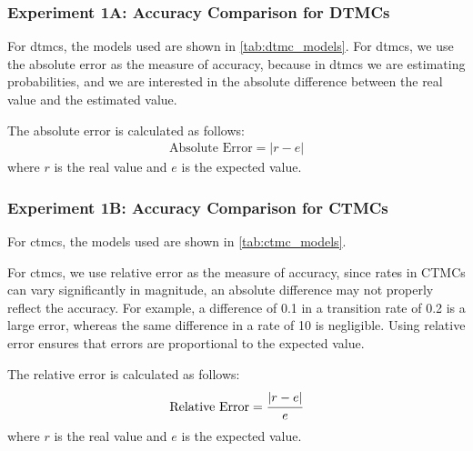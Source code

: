 
\subsubsection{Experiment 1A: Accuracy Comparison for DTMCs}
For \glspl{dtmc}, the models used are shown in \autoref{tab:dtmc_models}.
For \glspl{dtmc}, we use the absolute error as the measure of accuracy, because in \glspl{dtmc} we are estimating probabilities, and we are interested in the absolute difference between the real value and the estimated value.

The absolute error is calculated as follows:
\begin{equation}
    \begin{aligned}
        \text{Absolute Error} = |r - e|
    \end{aligned}
\end{equation}
where $r$ is the real value and $e$ is the expected value.


\subsubsection{Experiment 1B: Accuracy Comparison for CTMCs}
For \glspl{ctmc}, the models used are shown in \autoref{tab:ctmc_models}.

For \glspl{ctmc}, we use relative error as the measure of accuracy, since rates in CTMCs can vary significantly in magnitude, an absolute difference may not properly reflect the accuracy.
For example, a difference of 0.1 in a transition rate of 0.2 is a large error, whereas the same difference in a rate of 10 is negligible.
Using relative error ensures that errors are proportional to the expected value.

The relative error is calculated as follows:
\begin{equation}
    \begin{aligned}
        \text{Relative Error} = \cfrac{|r - e|}{e}
    \end{aligned}
\end{equation}
where $r$ is the real value and $e$ is the expected value.


